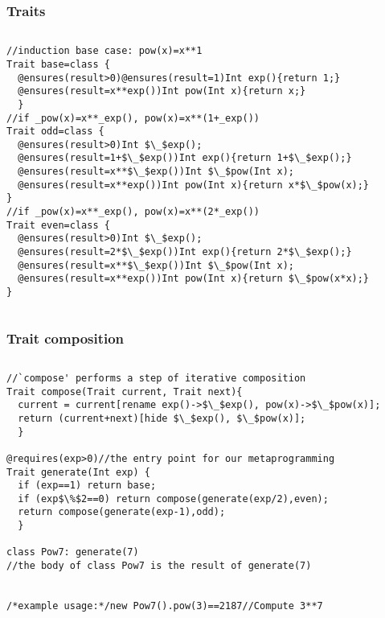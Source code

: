 \begin{frame}[fragile]
\frametitle{Traits}
\vspace{-1ex}
\begin{columns}
    \column{\dimexpr\paperwidth-10pt}
\begin{Scaled}{0.9}{0.9}
\begin{lstlisting}
//induction base case: pow(x)=x**1
Trait base=class {
  @ensures(result>0)@ensures(result=1)Int exp(){return 1;}  
  @ensures(result=x**exp())Int pow(Int x){return x;}
  }
//if _pow(x)=x**_exp(), pow(x)=x**(1+_exp())
Trait odd=class {
  @ensures(result>0)Int $\_$exp();
  @ensures(result=1+$\_$exp())Int exp(){return 1+$\_$exp();}
  @ensures(result=x**$\_$exp())Int $\_$pow(Int x);
  @ensures(result=x**exp())Int pow(Int x){return x*$\_$pow(x);}
}
//if _pow(x)=x**_exp(), pow(x)=x**(2*_exp())
Trait even=class {
  @ensures(result>0)Int $\_$exp();
  @ensures(result=2*$\_$exp())Int exp(){return 2*$\_$exp();}
  @ensures(result=x**$\_$exp())Int $\_$pow(Int x);
  @ensures(result=x**exp())Int pow(Int x){return $\_$pow(x*x);}
}
\end{lstlisting}
\end{Scaled}
\end{columns}
\end{frame}

\begin{frame}[fragile]
\frametitle{Trait composition}
\vspace{-3ex}
\begin{columns}
    \column{\dimexpr\paperwidth-10pt}
\begin{Scaled}{0.9}{0.9}
\begin{lstlisting}
//`compose' performs a step of iterative composition
Trait compose(Trait current, Trait next){
  current = current[rename exp()->$\_$exp(), pow(x)->$\_$pow(x)];
  return (current+next)[hide $\_$exp(), $\_$pow(x)];
  }

@requires(exp>0)//the entry point for our metaprogramming
Trait generate(Int exp) {
  if (exp==1) return base;
  if (exp$\%$2==0) return compose(generate(exp/2),even);
  return compose(generate(exp-1),odd);
  }

class Pow7: generate(7)
//the body of class Pow7 is the result of generate(7)


/*example usage:*/new Pow7().pow(3)==2187//Compute 3**7
\end{lstlisting}
\end{Scaled}
\end{columns}
\end{frame}

